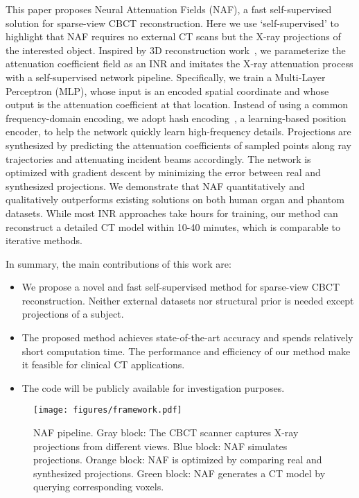 \documentclass[runningheads]{llncs}
\begin{document}
This paper proposes Neural Attenuation Fields (NAF), a fast self-supervised solution for sparse-view CBCT reconstruction. Here we use `self-supervised' to highlight that NAF requires no external CT scans but the X-ray projections of the interested object. Inspired by 3D reconstruction work~\cite{mildenhall2020nerf,park2019deepsdf}, we parameterize the attenuation coefficient field as an INR and imitates the X-ray attenuation process with a self-supervised network pipeline. Specifically, we train a Multi-Layer Perceptron (MLP), whose input is an encoded spatial coordinate  and whose output is the attenuation coefficient  at that location. Instead of using a common frequency-domain encoding, we adopt hash encoding~\cite{mueller2022instant}, a learning-based position encoder, to help the network quickly learn high-frequency details. Projections are synthesized by predicting the attenuation coefficients of sampled points along ray trajectories and attenuating incident beams accordingly. The network is optimized with gradient descent by minimizing the error between real and synthesized projections. We demonstrate that NAF quantitatively and qualitatively outperforms existing solutions on both human organ and phantom datasets. While most INR approaches take hours for training, our method can reconstruct a detailed CT model within 10-40 minutes, which is comparable to iterative methods.

In summary, the main contributions of this work are:
\begin{itemize}
    \item We propose a novel and fast self-supervised method for sparse-view CBCT reconstruction. Neither external datasets nor structural prior is needed except projections of a subject.
    \item The proposed method achieves state-of-the-art accuracy and spends relatively short computation time. The performance and efficiency of our method make it feasible for clinical CT applications.
    \item The code will be publicly available for investigation purposes.
\end{itemize}

\begin{figure}[!b]
\centering
    \texttt{[image: figures/framework.pdf]}
    \caption{
NAF pipeline. Gray block: The CBCT scanner captures X-ray projections from different views. Blue block: NAF simulates projections. Orange block: NAF is optimized by comparing real and synthesized projections. Green block: NAF generates a CT model by querying corresponding voxels.}
    \label{fig:framework}
\end{figure}
\end{document}
